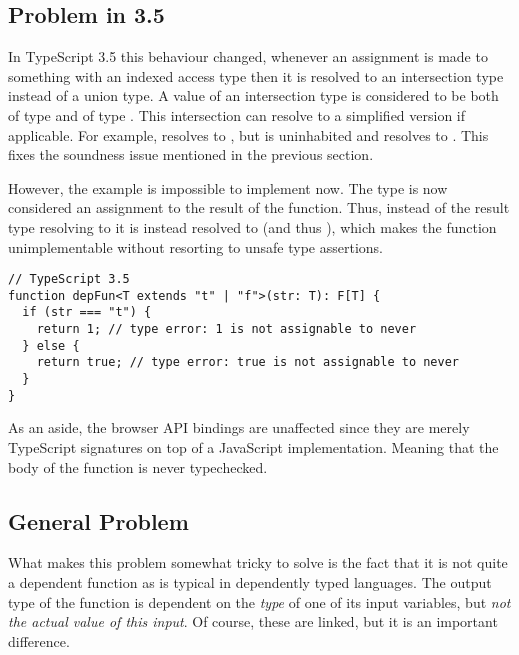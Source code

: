% 

\subsection{Problem in 3.5}

In TypeScript 3.5 this behaviour changed, whenever an assignment is made to something with an indexed access type then it is resolved to an intersection type instead of a union type. A value of an intersection type  is considered to be both of type  and of type . This intersection can resolve to a simplified version if applicable. For example,  resolves to , but  is uninhabited and resolves to . This fixes the soundness issue mentioned in the previous section.

However, the  example is impossible to implement now. The type  is now considered an assignment to the result of the function. Thus, instead of the result type resolving to  it is instead resolved to  (and thus ), which makes the function unimplementable without resorting to unsafe type assertions.

\begin{lstlisting}
// TypeScript 3.5
function depFun<T extends "t" | "f">(str: T): F[T] {
  if (str === "t") {
    return 1; // type error: 1 is not assignable to never
  } else {
    return true; // type error: true is not assignable to never
  }
}
\end{lstlisting}

As an aside, the browser API bindings are unaffected since they are merely TypeScript signatures on top of a JavaScript implementation. Meaning that the body of the function is never typechecked.

\subsection{General Problem}

What makes this problem somewhat tricky to solve is the fact that it is not quite a dependent function as is typical in dependently typed languages. The output type of the function is dependent on the \emph{type} of one of its input variables, but \emph{not the actual value of this input}. Of course, these are linked, but it is an important difference.

